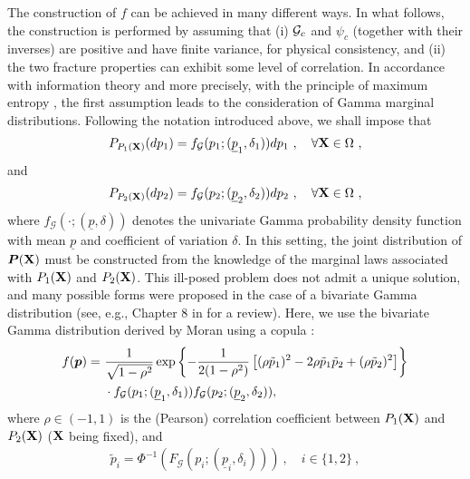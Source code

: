 \sloppy The construction of $f$ can be achieved in many different ways. In what follows, the construction is performed by assuming that (i) ${\mathcal{G}_c}$ and $\psi_c$ (together with their inverses) are positive and have finite variance, for physical consistency, and (ii) the two fracture properties can exhibit some level of correlation. In accordance with information theory \cite{Jaynes1957a,Jaynes1957b} and more precisely, with the principle of maximum entropy \cite{Shannon1948a,Shannon1948b}, the first assumption leads to the consideration of Gamma marginal distributions. Following the notation introduced above, we shall impose that
\begin{align}
  P_{P_1(\textbf{X})}(dp_1) = f_\mathcal{G}(p_1; (\underline{p}_1,\delta_{1}))dp_1~, \quad \forall \textbf{X} \in \Omega~,
\end{align}
and
\begin{align}
  P_{P_2(\textbf{X})}(dp_2) = f_\mathcal{G}(p_2; (\underline{p}_2,\delta_{2}))dp_2~, \quad \forall \textbf{X} \in \Omega~,
\end{align}
where $f_\mathcal{G}(\cdot; (\underline{p}, \delta))$ denotes the univariate Gamma probability density function with mean $\underline{p}$ and coefficient of variation $\delta$. In this setting, the joint distribution of $\boldsymbol{P}(\textbf{X})$ must be constructed from the knowledge of the marginal laws associated with $P_1(\textbf{X})$ and $P_2(\textbf{X})$. This ill-posed problem does not admit a unique solution, and many possible forms were proposed in the case of a bivariate Gamma distribution (see, e.g., Chapter 8 in \cite{Balakrishnan2009} for a review). Here, we use the bivariate Gamma distribution derived by Moran using a copula \cite{Moran1969}:
\begin{equation}
  \begin{aligned}
    f(\bs{p}) = & \ \frac{1}{\sqrt{1-\rho^2}}\exp\left\{-\frac{1}{2(1-\rho^2)}\left[(\rho \tilde{p}_1)^2-2\rho \tilde{p}_1\tilde{p}_2+(\rho \tilde{p}_2)^2\right]\right\} \\
                & \ \cdot f_\mathcal{G}(p_1; (\underline{p}_1,\delta_{1})) f_\mathcal{G}(p_2; (\underline{p}_2,\delta_{2})),                                              
  \end{aligned}
\end{equation}
where $\rho \in (-1,1)$ is the (Pearson) correlation coefficient between $P_1(\textbf{X})$ and $P_2(\textbf{X})$ ($\textbf{X}$ being fixed), and
\begin{align}
  \tilde{p}_i = \Phi^{-1}(F_\mathcal{G}(p_i; (\underline{p}_i,\delta_{i})))~, \quad i\in\{1,2\}~,
\end{align}
